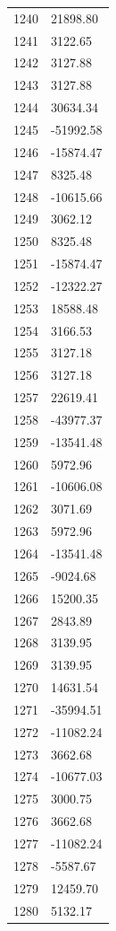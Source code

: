 \documentclass[a4paper,11pt]{article}
\begin{document}
\begin{center}
\begin{longtable}{|R{1.5cm}|R{2.5cm}|}
 1240 &     21898.80 \\
 1241 &      3122.65 \\
 1242 &      3127.88 \\
 1243 &      3127.88 \\
 1244 &     30634.34 \\
 1245 &    -51992.58 \\
 1246 &    -15874.47 \\
 1247 &      8325.48 \\
 1248 &    -10615.66 \\
 1249 &      3062.12 \\
 1250 &      8325.48 \\
 1251 &    -15874.47 \\
 1252 &    -12322.27 \\
 1253 &     18588.48 \\
 1254 &      3166.53 \\
 1255 &      3127.18 \\
 1256 &      3127.18 \\
 1257 &     22619.41 \\
 1258 &    -43977.37 \\
 1259 &    -13541.48 \\
 1260 &      5972.96 \\
 1261 &    -10606.08 \\
 1262 &      3071.69 \\
 1263 &      5972.96 \\
 1264 &    -13541.48 \\
 1265 &     -9024.68 \\
 1266 &     15200.35 \\
 1267 &      2843.89 \\
 1268 &      3139.95 \\
 1269 &      3139.95 \\
 1270 &     14631.54 \\
 1271 &    -35994.51 \\
 1272 &    -11082.24 \\
 1273 &      3662.68 \\
 1274 &    -10677.03 \\
 1275 &      3000.75 \\
 1276 &      3662.68 \\
 1277 &    -11082.24 \\
 1278 &     -5587.67 \\
 1279 &     12459.70 \\
 1280 &      5132.17 \\

\end{longtable}
\end{center}
\end{document}
